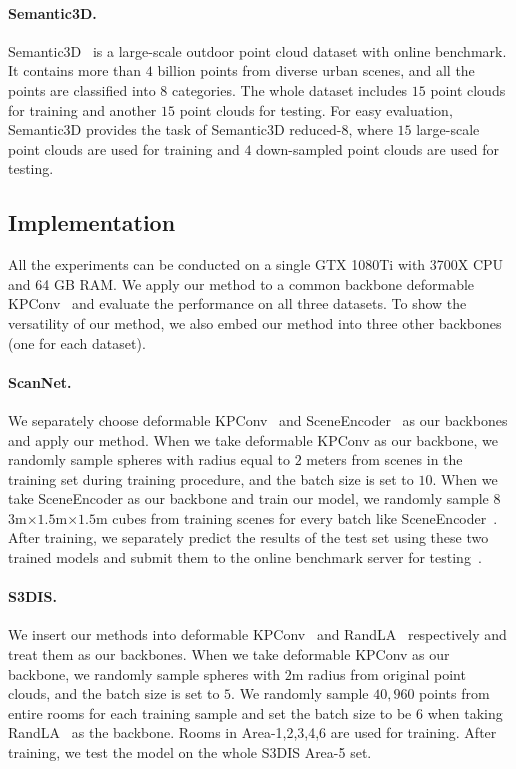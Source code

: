 \documentclass[final]{cvpr}
\begin{document}
\paragraph{Semantic3D.} Semantic3D~\cite{hackel2017semantic3d} is a large-scale outdoor point cloud dataset with online benchmark. It contains more than $4$ billion points from diverse urban scenes, and all the points are classified into $8$ categories. The whole dataset includes $15$ point clouds for training and another $15$ point clouds for testing. For easy evaluation, Semantic3D provides the task of Semantic3D reduced-8, where $15$ large-scale point clouds are used for training and $4$ down-sampled point clouds are used for testing. 

\subsection{Implementation}
\label{subsec:implementation}
All the experiments can be conducted on a single GTX 1080Ti with 3700X CPU and 64 GB RAM. We apply our method to a common backbone deformable KPConv~\cite{thomas2019kpconv} and evaluate the performance on all three datasets. To show the versatility of our method, we also embed our method into three other backbones (one for each dataset).
\paragraph{ScanNet.}
We separately choose deformable KPConv~\cite{thomas2019kpconv} and SceneEncoder~\cite{xu2020sceneencoder} as our backbones and apply our method.
When we take deformable KPConv as our backbone, we randomly sample spheres with radius equal to $2$ meters from scenes in the training set during training procedure, and the batch size is set to $10$.
When we take SceneEncoder as our backbone and train our model, we randomly sample $8$ $3$m$\times$$1.5$m$\times$$1.5$m cubes from training scenes for every batch like SceneEncoder~\cite{xu2020sceneencoder}. 
After training, we separately predict the results of the test set using these two trained models and submit them to the online benchmark server for testing~\cite{dai2017scannet}. 

\paragraph{S3DIS.}
We insert our methods into deformable KPConv~\cite{thomas2019kpconv} and RandLA~\cite{hu2020randla} respectively and treat them as our backbones. When we take deformable KPConv as our backbone, we randomly sample spheres with $2$m radius from original point clouds, and the batch size is set to $5$. We randomly sample $40,960$ points from entire rooms for each training sample and set the batch size to be $6$ when taking RandLA~\cite{hu2020randla} as the backbone. Rooms in Area-1,2,3,4,6 are used for training. After training, we test the model on the whole S3DIS Area-5 set.
\end{document}
